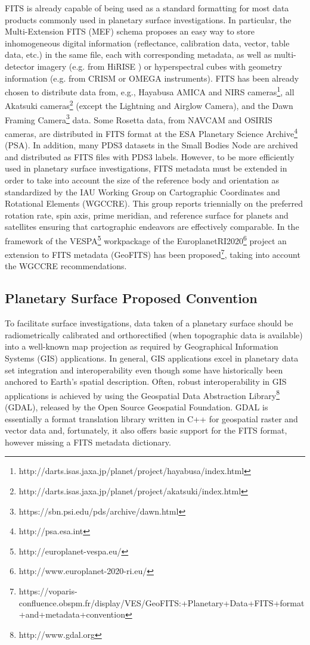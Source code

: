 FITS is already capable of being used as a standard formatting for most data products
commonly used in planetary surface investigations.
In particular, the Multi-Extension FITS (MEF) schema proposes an easy way
to store inhomogeneous digital information (reflectance, calibration data,
vector, table data, etc.) in the same file, each with corresponding metadata,
as well as multi-detector imagery (e.g. from HiRISE \citep{hirise})
or hyperspectral cubes with geometry information (e.g. from CRISM
\citep{crism} or OMEGA \citep{omega} instruments).
FITS has been already chosen to distribute data from, e.g.,
Hayabusa AMICA and NIRS cameras\footnote{http://darts.isas.jaxa.jp/planet/project/hayabusa/index.html},
all Akatsuki cameras\footnote{http://darts.isas.jaxa.jp/planet/project/akatsuki/index.html}
(except the Lightning and Airglow Camera),
and the Dawn Framing Camera\footnote{https://sbn.psi.edu/pds/archive/dawn.html} data.
Some Rosetta data, from NAVCAM and OSIRIS cameras, are distributed in FITS format at
the ESA Planetary Science Archive\footnote{http://psa.esa.int} (PSA).
In addition, many PDS3 datasets in the Small Bodies Node are archived and distributed
as FITS files with PDS3 labels.
However, to be more efficiently used in planetary surface investigations, FITS metadata
must be extended in order to take into account the size of the reference body and
orientation as standardized by the IAU Working Group on Cartographic Coordinates and
Rotational Elements (WGCCRE).
This group reports triennially \citep{wgccre} on the preferred rotation rate,
spin axis, prime meridian, and reference surface for planets and satellites
ensuring that cartographic endeavors are effectively comparable.
In the framework of the VESPA\footnote{http://europlanet-vespa.eu/}
\citep{vespapss} workpackage of the EuroplanetRI2020\footnote{http://www.europlanet-2020-ri.eu/}
project an extension to FITS metadata (GeoFITS) has been
proposed\footnote{https://voparis-confluence.obspm.fr/display/VES/GeoFITS:+Planetary+Data+FITS+format+and+metadata+convention},
taking into account the WGCCRE recommendations.

\subsection{Planetary Surface Proposed Convention}
\label{ssec:geofits}
To facilitate surface investigations, data taken of a planetary surface should be
radiometrically calibrated and orthorectified (when topographic data is available)
into a well-known map projection as required by Geographical Information Systems (GIS)
applications.
In general, GIS applications excel in planetary data set integration and 
interoperability even though some have historically been anchored to Earth's spatial
description.
Often, robust interoperability in GIS applications is achieved by using the Geospatial
Data Abstraction Library\footnote{http://www.gdal.org} (GDAL), released by the Open
Source Geospatial Foundation.
GDAL is essentially a format translation library written in C++ for geospatial raster
and vector data and, fortunately, it also offers basic support for the FITS format,
however missing a FITS metadata dictionary. 


